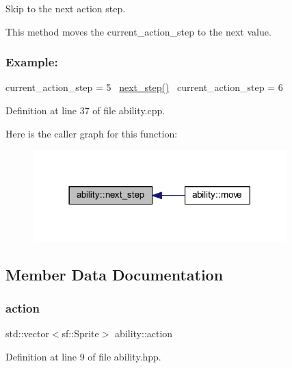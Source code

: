 Skip to the next action step. 

This method moves the current\+\_\+action\+\_\+step to the next value. ~\newline


\subsubsection*{Example\+: }

current\+\_\+action\+\_\+step = 5~\newline
\hyperlink{classability_aed378a7d8a69e8a50347bcc03c0cffb3}{next\+\_\+step()}~\newline
current\+\_\+action\+\_\+step = 6~\newline


Definition at line 37 of file ability.\+cpp.

Here is the caller graph for this function\+:
\nopagebreak
\begin{figure}[H]
\begin{center}
\leavevmode
\includegraphics[width=278pt]{classability_aed378a7d8a69e8a50347bcc03c0cffb3_icgraph}
\end{center}
\end{figure}


\subsection{Member Data Documentation}
\mbox{\label{classability_aaccb2020f374c640eddfce7f1a669821}} 
\subsubsection{\texorpdfstring{action}{action}}
{\footnotesize\ttfamily std\+::vector$<$sf\+::\+Sprite$>$ ability\+::action\hspace{0.3cm}{\ttfamily [private]}}



Definition at line 9 of file ability.\+hpp.

